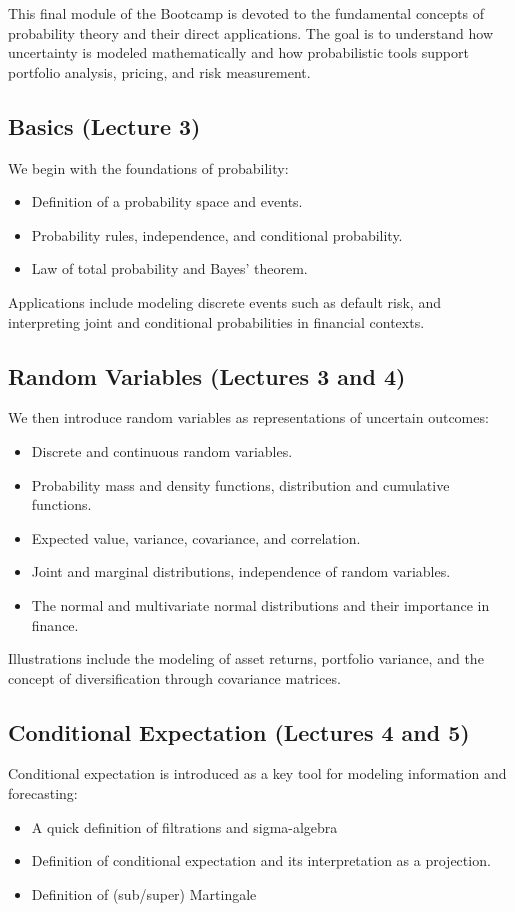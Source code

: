 \documentclass[12pt,a4paper]{article}
\begin{document}
This final module of the Bootcamp is devoted to the fundamental concepts of probability theory and their direct applications. The goal is to understand how uncertainty is modeled mathematically and how probabilistic tools support portfolio analysis, pricing, and risk measurement.

\subsection{Basics (Lecture 3)}
We begin with the foundations of probability:
\begin{itemize}[itemsep=-4pt, topsep=2pt]
    \item Definition of a probability space and events.
    \item Probability rules, independence, and conditional probability.
    \item Law of total probability and Bayes' theorem.
\end{itemize}
Applications include modeling discrete events such as default risk, and interpreting joint and conditional probabilities in financial contexts.

\subsection{Random Variables (Lectures 3 and 4)}
We then introduce random variables as representations of uncertain outcomes:
\begin{itemize}[itemsep=-4pt, topsep=2pt]
    \item Discrete and continuous random variables.
    \item Probability mass and density functions, distribution and cumulative functions.
    \item Expected value, variance, covariance, and correlation.
    \item Joint and marginal distributions, independence of random variables.
    \item The normal and multivariate normal distributions and their importance in finance.
\end{itemize}
Illustrations include the modeling of asset returns, portfolio variance, and the concept of diversification through covariance matrices.

\subsection{Conditional Expectation (Lectures 4 and 5)}
Conditional expectation is introduced as a key tool for modeling information and forecasting:
\begin{itemize}[itemsep=-4pt, topsep=2pt]
    \item A quick definition of filtrations and sigma-algebra 
    \item Definition of conditional expectation and its interpretation as a projection.
    \item Definition of (sub/super) Martingale
\end{itemize}
\end{document}
